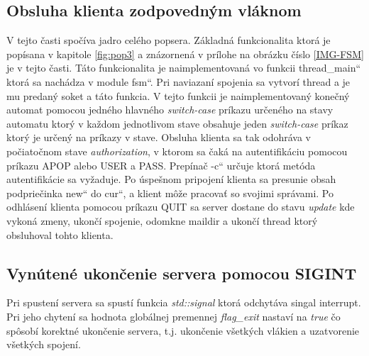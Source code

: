 \documentclass[11pt,a4paper]{article}
\providecommand{\uv}[1]{\quotedblbase #1\textquotedblleft}
\begin{document}
	\subsection{Obsluha klienta zodpovedným vláknom}
		\indent V tejto časti spočíva jadro celého popsera. Základná funkcionalita ktorá je popísana v kapitole \ref{fig:pop3} a znázornená v prílohe na obrázku číslo \ref{IMG-FSM} je v tejto časti. Táto funkcionalita je naimplementovaná vo funkcii \uv{thread\_main} ktorá sa nachádza v module \uv{fsm}. Pri naviazaní spojenia sa vytvorí thread a je mu predaný soket a táto funkcia. V tejto funkcii je naimplementovaný konečný automat pomocou jedného hlavného \textit{switch-case} príkazu určeného na stavy automatu ktorý v každom jednotlivom stave obsahuje jeden \textit{switch-case} príkaz ktorý je určený na príkazy v stave. Obsluha klienta sa tak odohráva v počiatočnom stave \textit{authorization}, v ktorom sa čaká na autentifikáciu pomocou príkazu APOP alebo USER a PASS. Prepínač \uv{-c} určuje ktorá metóda autentifikácie sa vyžaduje. Po úspešnom pripojení klienta sa presunie obsah podpriečinka \uv{new} do \uv{cur}, a klient môže pracovať so svojimi správami. Po odhlásení klienta pomocou príkazu QUIT sa server dostane do stavu \textit{update} kde vykoná zmeny, ukončí spojenie, odomkne maildir a ukončí thread ktorý obsluhoval tohto klienta.

	\subsection{Vynútené ukončenie servera pomocou SIGINT}
		\indent Pri spustení servera sa spustí funkcia \textit{std::signal} ktorá odchytáva singal interrupt. Pri jeho chytení sa hodnota globálnej premennej \textit{flag\_exit} nastaví na \textit{true} čo spôsobí korektné ukončenie servera, t.j. ukončenie všetkých vlákien a uzatvorenie všetkých spojení.
\end{document}
